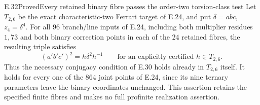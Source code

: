 \begin{statement}{E.32}{Proved}{Every retained binary fibre passes the order-two torsion-class test}
Let $T_{2,6}$ be the exact characteristic-two Ferrari target of E.24,
and put $\delta=abc$, $z_4=\delta^4$.
For all $96$ branch/line inputs of E.24, including both multiplier
residues $1,73$ and both binary correction points in each of the
$24$ retained fibres, the resulting triple satisfies
\[
 (a'b'c')^2=h\delta^2h^{-1}
       \qquad\text{for an explicitly certified }h\in T_{2,6}.
 \tag{E.32.1}
\]
Thus the necessary conjugacy condition of E.30 holds already in
$T_{2,6}$ itself. It holds for every one of the $864$ joint points
of E.24, since its nine ternary parameters leave the binary
coordinates unchanged. This assertion retains the specified
finite fibres and makes no full profinite realization assertion.
\end{statement}
